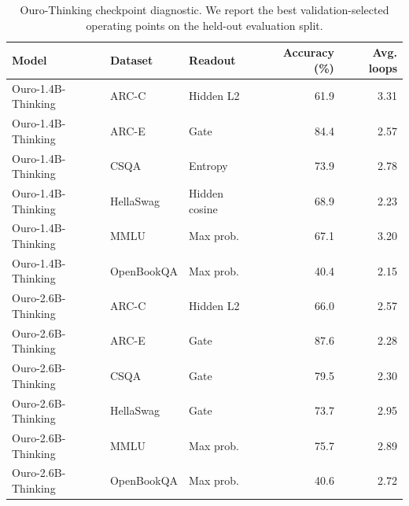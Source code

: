 \documentclass[10pt]{article} %
\begin{document}
\begin{table}[htbp]
\centering
\caption{
Ouro-Thinking checkpoint diagnostic.
We report the best validation-selected operating points on the held-out evaluation split.
}
\label{tab:ouro_thinking_diagnostic}
\begin{tabular}{lllrr}
\toprule
Model & Dataset & Readout & Accuracy (\%) & Avg. loops \\
\midrule
Ouro-1.4B-Thinking & ARC-C & Hidden L2 & 61.9 & 3.31 \\
Ouro-1.4B-Thinking & ARC-E & Gate & 84.4 & 2.57 \\
Ouro-1.4B-Thinking & CSQA & Entropy & 73.9 & 2.78 \\
Ouro-1.4B-Thinking & HellaSwag & Hidden cosine & 68.9 & 2.23 \\
Ouro-1.4B-Thinking & MMLU & Max prob. & 67.1 & 3.20 \\
Ouro-1.4B-Thinking & OpenBookQA & Max prob. & 40.4 & 2.15 \\
\midrule
Ouro-2.6B-Thinking & ARC-C & Hidden L2 & 66.0 & 2.57 \\
Ouro-2.6B-Thinking & ARC-E & Gate & 87.6 & 2.28 \\
Ouro-2.6B-Thinking & CSQA & Gate & 79.5 & 2.30 \\
Ouro-2.6B-Thinking & HellaSwag & Gate & 73.7 & 2.95 \\
Ouro-2.6B-Thinking & MMLU & Max prob. & 75.7 & 2.89 \\
Ouro-2.6B-Thinking & OpenBookQA & Max prob. & 40.6 & 2.72 \\
\bottomrule
\end{tabular}
\end{table}
\end{document}
